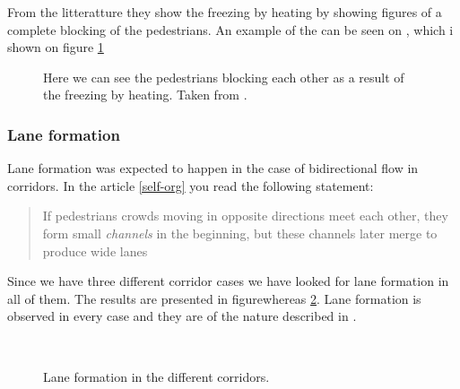 From the litteratture they show the freezing by heating by showing figures of a complete blocking of the pedestrians. An example of the can be seen on \cite{oscil}, which i shown on figure \ref{fig:freezing_by_heating_litterature}

\begin{figure}[h]
\centering
{}
\caption{Here we can see the pedestrians blocking each other as a result of the freezing by heating. Taken from \cite{oscil}.}
\label{fig:freezing_by_heating_litterature}
\end{figure}


\subsubsection{Lane formation}
Lane formation was expected to happen in the case of bidirectional
flow in corridors. In the article \ref{self-org} you read the following
statement:

\begin{quote}
If pedestrians crowds moving in opposite directions meet each other,
they form small \emph{channels} in the beginning, but these channels
later merge to produce wide lanes
\end{quote}

Since we have three different corridor cases we have looked for lane
formation in all of them. The results are presented in figurewhereas
\ref{fig:laneformation}. Lane formation is observed in every case
and they are of the nature described in \cite{self-org}.\\

\begin{figure}[h]
\centering
{}
\\
\caption{Lane formation in the different corridors.}
\label{fig:laneformation}
\end{figure}

